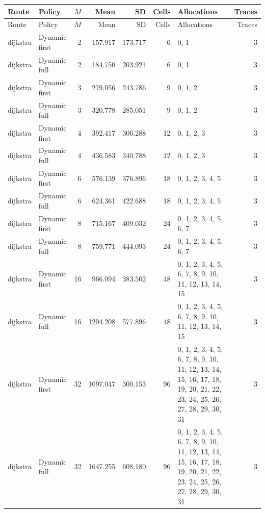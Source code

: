 \documentclass[10pt,a4paper]{article}
\begin{document}
\tiny\setlength{\tabcolsep}{2pt}\begin{longtable}{@{}p{23mm}p{29mm}rrrrp{36mm}r@{}}
\toprule Route & Policy & $M$ & Mean & SD & Cells & Allocations & Traces \\ \midrule\endfirsthead
\toprule Route & Policy & $M$ & Mean & SD & Cells & Allocations & Traces \\ \midrule\endhead
\bottomrule\endfoot
dijkstra & Dynamic first & 2 & 157.917 & 173.717 & 6 & 0, 1 & 3 \\
dijkstra & Dynamic full & 2 & 184.750 & 203.921 & 6 & 0, 1 & 3 \\
dijkstra & Dynamic first & 3 & 279.056 & 243.786 & 9 & 0, 1, 2 & 3 \\
dijkstra & Dynamic full & 3 & 320.778 & 285.051 & 9 & 0, 1, 2 & 3 \\
dijkstra & Dynamic first & 4 & 392.417 & 306.288 & 12 & 0, 1, 2, 3 & 3 \\
dijkstra & Dynamic full & 4 & 436.583 & 340.788 & 12 & 0, 1, 2, 3 & 3 \\
dijkstra & Dynamic first & 6 & 576.139 & 376.896 & 18 & 0, 1, 2, 3, 4, 5 & 3 \\
dijkstra & Dynamic full & 6 & 624.361 & 422.688 & 18 & 0, 1, 2, 3, 4, 5 & 3 \\
dijkstra & Dynamic first & 8 & 715.167 & 409.032 & 24 & 0, 1, 2, 3, 4, 5, 6, 7 & 3 \\
dijkstra & Dynamic full & 8 & 759.771 & 444.093 & 24 & 0, 1, 2, 3, 4, 5, 6, 7 & 3 \\
dijkstra & Dynamic first & 16 & 966.094 & 383.502 & 48 & 0, 1, 2, 3, 4, 5, 6, 7, 8, 9, 10, 11, 12, 13, 14, 15 & 3 \\
dijkstra & Dynamic full & 16 & 1204.208 & 577.896 & 48 & 0, 1, 2, 3, 4, 5, 6, 7, 8, 9, 10, 11, 12, 13, 14, 15 & 3 \\
dijkstra & Dynamic first & 32 & 1097.047 & 300.153 & 96 & 0, 1, 2, 3, 4, 5, 6, 7, 8, 9, 10, 11, 12, 13, 14, 15, 16, 17, 18, 19, 20, 21, 22, 23, 24, 25, 26, 27, 28, 29, 30, 31 & 3 \\
dijkstra & Dynamic full & 32 & 1647.255 & 608.180 & 96 & 0, 1, 2, 3, 4, 5, 6, 7, 8, 9, 10, 11, 12, 13, 14, 15, 16, 17, 18, 19, 20, 21, 22, 23, 24, 25, 26, 27, 28, 29, 30, 31 & 3 \\
\end{longtable}\normalsize\setlength{\tabcolsep}{6pt}
\clearpage
\end{document}
